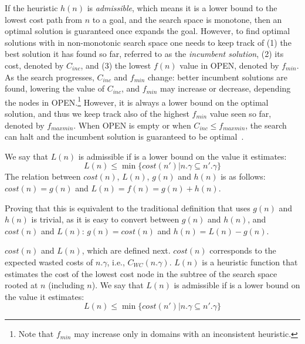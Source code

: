 {If the heuristic $h(n)$ is \emph{admissible}, which means it is a lower bound to the lowest cost path from $n$ to a goal, and the search space is monotone, then an optimal solution is guaranteed once \astar{} expands the goal. However, to find optimal solutions with \astar{} in non-monotonic search space one needs to keep track of (1) the best solution it has found so far, referred to as the \emph{incumbent solution}, (2) its cost, denoted by $C_{inc}$, and (3) the lowest $f(n)$ value in OPEN, denoted by $f_{min}$. 
As the search progresses, $C_{inc}$ and $f_{min}$ change: better incumbent solutions are found, lowering the value of $C_{inc}$, 
and $f_{min}$ may increase or decrease, depending the nodes in OPEN.\footnote{Note that $f_{min}$ may increase only in domains with an inconsistent heuristic.} However, it is always a lower bound on the optimal solution, and thus we keep track also of the highest $f_{min}$ value seen so far, denoted by $f_{maxmin}$. When OPEN is empty or when $C_{inc}\leq f_{maxmin}$, the search can halt and the incumbent solution is guaranteed to be optimal~\cite{stern2014max}. 









We say that $L(n)$ is admissible if is a lower bound on the value it estimates: \begin{equation}
 L(n)\leq \min \{cost(n')| n.\gamma \subseteq n'.\gamma\}  \label{eq:admissibility}
\end{equation}
The relation between $cost(n)$, $L(n)$, $g(n)$ and $h(n)$ is as follows:
$cost(n)=g(n)$ and $L(n)=f(n)=g(n)+h(n)$. 

Proving that this \astar{} is equivalent to the traditional \astar{} definition that uses $g(n)$ and $h(n)$ is trivial, 
as it is easy to convert between $g(n)$ and $h(n)$, and $cost(n)$ and $L(n)$: 
$g(n)=cost(n)$ and $h(n)=L(n)-g(n)$. 


$cost(n)$ and $L(n)$, which are defined next. $cost(n)$ corresponds to the expected wasted costs of $n.\gamma$, i.e., $C_{WC}(n.\gamma)$. $L(n)$ is a heuristic function that estimates the cost of the lowest cost node in the subtree of the \brpswc{} search space rooted at $n$ (including $n$). We say that $L(n)$ is admissible if is a lower bound on the value it estimates: \begin{equation}
 L(n)\leq \min \{cost(n')| n.\gamma \subseteq n'.\gamma\}  \label{eq:admissibility}
\end{equation}









}
